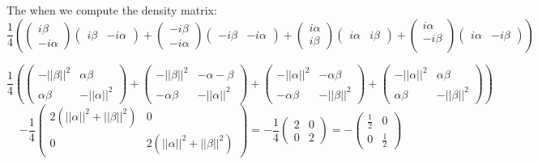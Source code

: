 \documentclass[a4paper,10pt]{article}
\begin{document}
\begin{enumerate}[1.]
The when we compute the density matrix:
$$
\frac{1}{4}\left(
\left(
\begin{array}{c}
i\beta\\
-i\alpha
\end{array}
\right)
\left(
\begin{array}{cc}
i\beta & -i\alpha
\end{array}
\right)
+
\left(
\begin{array}{c}
-i\beta\\
-i\alpha
\end{array}
\right)
\left(
\begin{array}{cc}
-i\beta&-i\alpha
\end{array}
\right)
+
\left(
\begin{array}{c}
i\alpha\\
i\beta
\end{array}
\right)
\left(
\begin{array}{cc}
i\alpha & i\beta
\end{array}
\right)
+
\left(
\begin{array}{c}
i\alpha\\
-i\beta\\
\end{array}
\right)
\left(
\begin{array}{cc}
i\alpha & -i\beta
\end{array}
\right)
\right)
$$

$$
\frac{1}{4}\left(
\left(
\begin{array}{cc}
-||\beta||^2 & \alpha\beta \\
\alpha\beta & -||\alpha||^2
\end{array}
\right)
+
\left(
\begin{array}{cc}
-||\beta||^2 & -\alpha-\beta \\
-\alpha\beta &  -||\alpha||^2
\end{array}
\right)
+
\left(
\begin{array}{cc}
-||\alpha||^2 & -\alpha\beta \\
-\alpha\beta &  -||\beta||^2
\end{array}
\right)
+
\left(
\begin{array}{cc}
-||\alpha||^2 & \alpha\beta \\
\alpha\beta & -||\beta||^2
\end{array}
\right)
\right)
$$
$$
-\frac{1}{4}\left(
\begin{array}{cc}
2(||\alpha||^2 + ||\beta||^2) & 0 \\
0 & 2(||\alpha||^2 + ||\beta||^2)
\end{array}
\right)
=
-\frac{1}{4}\left(
\begin{array}{cc}
2 & 0 \\
0 & 2
\end{array}
\right)
=
-\left(
\begin{array}{cc}
\frac{1}{2} & 0 \\
0 & \frac{1}{2}
\end{array}
\right)
$$


\end{enumerate}
\end{document}
